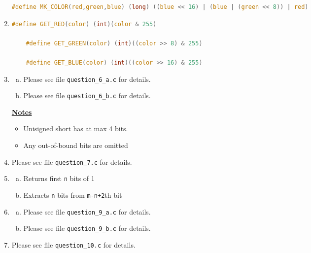 \documentclass[12pt]{article}
\begin{document}
\begin{enumerate}[1.]
\begin{lstlisting}[language=c]
    #define MK_COLOR(red,green,blue) (long) ((blue << 16) | (blue | (green << 8)) | red)
\end{lstlisting}

    \item

\begin{lstlisting}[language=c]
    #define GET_RED(color) (int)(color & 255)

    #define GET_GREEN(color) (int)((color >> 8) & 255)

    #define GET_BLUE(color) (int)((color >> 16) & 255)
\end{lstlisting}

    \item

    \begin{enumerate}[a)]

        \item

        Please see file \texttt{question\_6\_a.c} for details.

        \item

        Please see file \texttt{question\_6\_b.c} for details.

    \end{enumerate}

    \bigskip

    \underline{\textbf{Notes}}

    \begin{itemize}
        \item Unisigned short has at max 4 bits.
        \item Any out-of-bound bits are omitted
    \end{itemize}

    \item

    Please see file \texttt{question\_7.c} for details.

    \item

    \begin{enumerate}[a)]
        \item Returns first \texttt{n} bits of 1
        \item Extracts \texttt{n} bits from \texttt{m-n+2}th bit
    \end{enumerate}

    \item

    \begin{enumerate}[a)]
        \item

        Please see file \texttt{question\_9\_a.c} for details.

        \item

        Please see file \texttt{question\_9\_b.c} for details.
    \end{enumerate}

    \item

    Please see file \texttt{question\_10.c} for details.

\end{enumerate}
\end{document}
